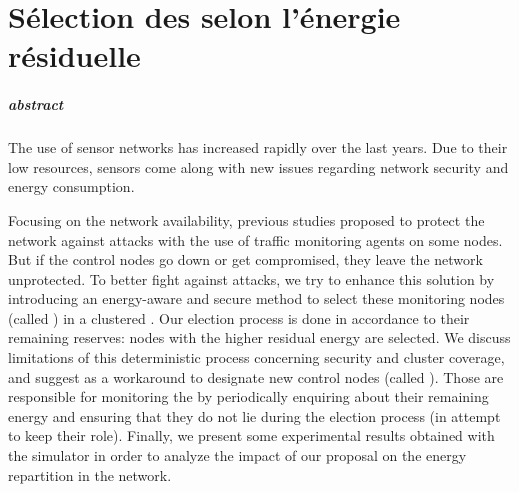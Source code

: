 \chapter{Sélection des \cns selon l'énergie résiduelle}\label{chap:se}

\renewcommand\chapterpath{Main/SelecEnergie}
\renewcommand\chapterfig{Main/SelecEnergie/Figures}

\paragraph{abstract}
The use of sensor networks has increased rapidly over the last years.
Due to their low resources, sensors come along with new issues regarding network security and energy consumption.

Focusing on the network availability, previous studies proposed to protect the network against \dos attacks with the use of traffic monitoring agents on some nodes.
But if the control nodes go down or get compromised, they leave the network unprotected.
To better fight against attacks, we try to enhance this solution by introducing an energy-aware and secure method to select these monitoring nodes (called \cns) in a clustered \wsn.
Our election process is done in accordance to their remaining reserves: nodes with the higher residual energy are selected.
We discuss limitations of this deterministic process concerning security and cluster coverage, and suggest as a workaround to designate new control nodes (called \vns).
Those \vns are responsible for monitoring the \cns by periodically enquiring about their remaining energy and ensuring that they do not lie during the election process (in attempt to keep their \cn role).
Finally, we present some experimental results obtained with the \ns simulator in order to analyze the impact of our proposal on the energy repartition in the network.








